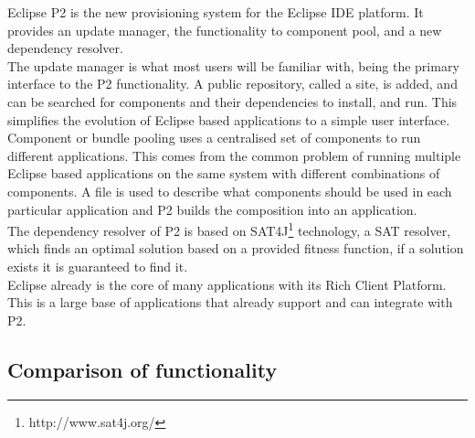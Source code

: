 Eclipse P2
is the new provisioning system for the Eclipse IDE platform.
It provides an update manager, the functionality to component pool, and a new dependency resolver.\\
The update manager is what most users will be familiar with, being the primary interface to the P2 functionality. 
A public repository, called a site, is added, and can be searched for components and their dependencies to install, and run.
This simplifies the evolution of Eclipse based applications to a simple user interface.\\
Component or bundle pooling uses a centralised set of components to run different applications.
This comes from the common problem of running multiple Eclipse based applications on the same system with different combinations of components.
A file is used to describe what components should be used in each particular application and P2 builds the composition into an application.\\
The dependency resolver of P2 is based on SAT4J\footnote{http://www.sat4j.org/} technology, a SAT resolver, which finds an optimal solution based on
a provided fitness function, if a solution exists it is guaranteed to find it.\\  
Eclipse already is
the core of many applications with its Rich Client Platform. This is a large base of applications that already support and can integrate with P2.


\subsection{Comparison of functionality}








